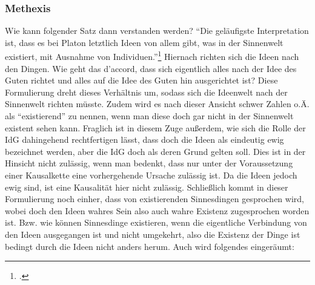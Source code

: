 \subsubsection{Methexis}
Wie kann folgender Satz dann verstanden werden? \enquote{Die geläufigste Interpretation ist, dass es bei Platon letztlich Ideen von allem gibt, was in der Sinnenwelt existiert, mit Ausnahme von Individuen.}\footcite[][S. 31]{DisseMetaphysik} 
Hiernach richten sich die Ideen nach den Dingen. Wie geht das d'accord, dass sich eigentlich alles nach der Idee des Guten richtet und alles auf die Idee des Guten hin ausgerichtet ist? Diese Formulierung dreht dieses Verhältnis um, sodass sich die Ideenwelt nach der Sinnenwelt richten müsste. Zudem wird es nach dieser Ansicht schwer Zahlen o.Ä. als \enquote{existierend} zu nennen, wenn man diese doch gar nicht in der Sinnenwelt existent sehen kann. 
Fraglich ist in diesem Zuge außerdem, wie sich die Rolle der IdG dahingehend rechtfertigen lässt, dass doch die Ideen als eindeutig ewig bezeichnet werden, aber die IdG doch als deren Grund gelten soll. Dies ist in der Hinsicht nicht zulässig, wenn man bedenkt, dass nur unter der Voraussetzung einer Kausalkette eine vorhergehende Ursache zulässig ist. Da die Ideen jedoch ewig sind, ist eine Kausalität hier nicht zulässig.
Schließlich kommt in dieser Formulierung noch einher, dass von existierenden Sinnesdingen gesprochen wird, wobei doch den Ideen wahres Sein also auch wahre Existenz zugesprochen worden ist. Bzw. wie können Sinnesdinge existieren, wenn die eigentliche Verbindung von den Ideen ausgegangen ist und nicht umgekehrt, also die Existenz der Dinge ist bedingt durch die Ideen nicht anders herum.
Auch wird folgendes eingeräumt: 


